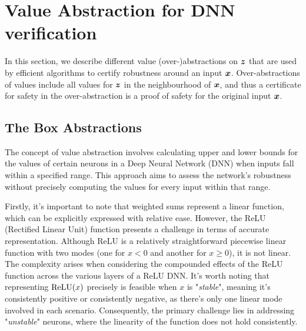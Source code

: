 	\section{Value Abstraction for DNN verification}

In this section, we describe different value (over-)abstractions on ${\bm{z}}$ that are used by efficient algorithms to certify robustness around an input ${\bm{x}}$. Over-abstractions of values include all values for ${\bm{z}}$ in the neighbourhood of ${\bm{x}}$, and thus a certificate for safety in the over-abstraction is a proof of safety for the original input ${\bm{x}}$.

\subsection{The Box Abstractions}





The concept of value abstraction involves calculating upper and lower bounds for the values of certain neurons in a Deep Neural Network (DNN) when inputs fall within a specified range. This approach aims to assess the network's robustness without precisely computing the values for every input within that range.

Firstly, it's important to note that weighted sums represent a linear function, which can be explicitly expressed with relative ease. However, the ReLU (Rectified Linear Unit) function presents a challenge in terms of accurate representation. Although ReLU is a relatively straightforward piecewise linear function with two modes (one for $x<0$ and another for $x \geq 0$), it is not linear. The complexity arises when considering the compounded effects of the ReLU function across the various layers of a ReLU DNN. It's worth noting that representing $\mathrm{ReLU}(x)$ precisely is feasible when $x$ is "{\em stable}", meaning it's consistently positive or consistently negative, as there's only one linear mode involved in each scenario. Consequently, the primary challenge lies in addressing "{\em unstable}" neurons, where the linearity of the function does not hold consistently.



